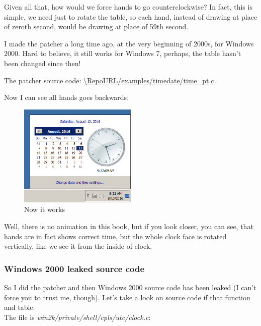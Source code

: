 Given all that, how would we force hands to go counterclockwise?
In fact, this is simple, we need just to rotate the table, so each hand, instead of drawing at place of zeroth second,
would be drawing at place of 59th second.

I made the patcher a long time ago, at the very beginning of 2000s, for Windows 2000.
Hard to believe, it still works for Windows 7, perhaps, the table hasn't been changed since then!

The patcher source code: \url{\RepoURL/examples/timedate/time_pt.c}.

Now I can see all hands goes backwards:

\begin{figure}[H]
\centering
\includegraphics[width=0.5\textwidth]{examples/timedate/counterclockwise.png}
\caption{Now it works}
\end{figure}

Well, there is no animation in this book, but if you look closer, you can see, that hands are in fact shows correct
time, but the whole clock face is rotated vertically, like we see it from the inside of clock.

\subsubsection{Windows 2000 leaked source code}

So I did the patcher and then Windows 2000 source code has been leaked (I can't force you to trust me, though).
Let's take a look on source code if that function and table.\\
The file is \emph{win2k/private/shell/cpls/utc/clock.c}:

